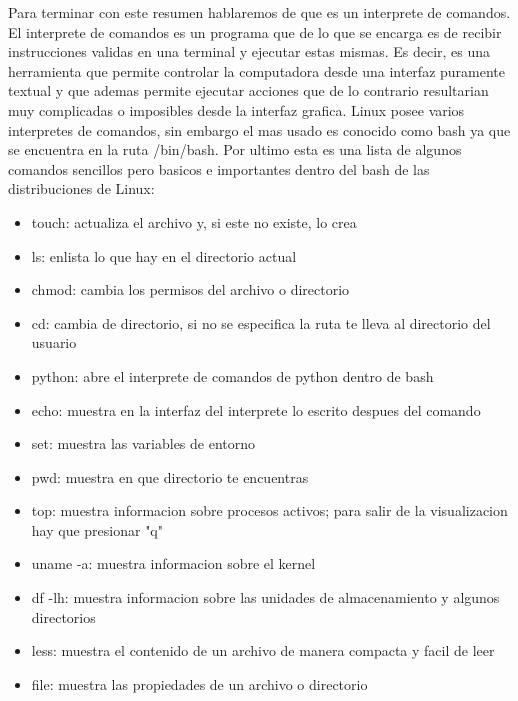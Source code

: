 \documentclass[letterpaper, 12pt, oneside]{article}
\begin{document}
	Para terminar con este resumen hablaremos de que es un interprete de comandos. El interprete de comandos es un programa que de lo que se encarga es de recibir instrucciones validas en una terminal y ejecutar estas mismas. Es decir, es una herramienta que permite controlar la computadora desde una interfaz puramente textual y que ademas permite ejecutar acciones que de lo contrario resultarian muy complicadas o imposibles desde la interfaz grafica. Linux posee varios interpretes de comandos, sin embargo el mas usado es conocido como bash ya que se encuentra en la ruta /bin/bash. Por ultimo esta es una lista de algunos comandos sencillos pero basicos e importantes dentro del bash de las distribuciones de Linux:
	\\
	\begin{itemize}
		\item touch: actualiza el archivo y, si este no existe, lo crea
		\item ls: enlista lo que hay en el directorio actual
		\item chmod: cambia los permisos del archivo o directorio
		\item cd: cambia de directorio, si no se especifica la ruta te lleva al directorio del usuario
		\item python: abre el interprete de comandos de python dentro de bash
		\item echo: muestra en la interfaz del interprete lo escrito despues del comando
		\item set: muestra las variables de entorno
		\item pwd: muestra en que directorio te encuentras
		\item top: muestra informacion sobre procesos activos; para salir de la visualizacion hay que presionar "q"
		\item uname -a: muestra informacion sobre el kernel
		\item df -lh: muestra informacion sobre las unidades de almacenamiento y algunos directorios
		\item less: muestra el contenido de un archivo de manera compacta y facil de leer
		\item file: muestra las propiedades de un archivo o directorio
	\\
	\end{itemize}
\end{document}
